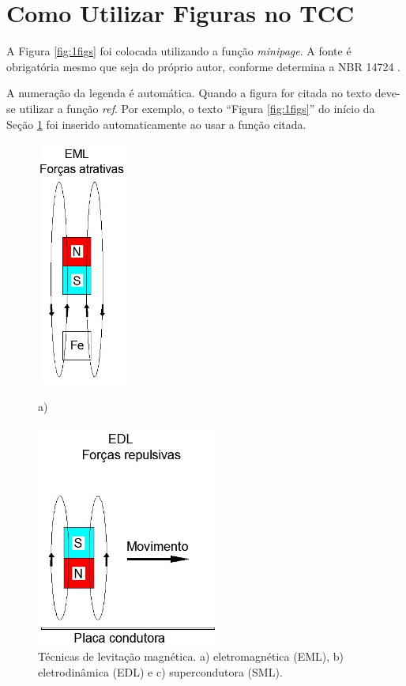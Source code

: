 \documentclass[
        oneside,      %
        english,			
        brazil			 
        ]{configcefetmglpd}
\begin{document}
\section{Como Utilizar Figuras no TCC} \label{sec:figuras_tcc}
A Figura \ref{fig:1figs} foi colocada utilizando a função \textit{minipage}. A fonte é obrigatória mesmo que seja do próprio autor, conforme determina a NBR 14724 \cite{bib:abnt14724}.

A numeração da legenda é automática. Quando a figura for citada no texto deve-se utilizar a função \textit{ref}. Por exemplo, o texto “Figura \ref{fig:1figs}” do início da Seção \ref{sec:figuras_tcc} foi inserido automaticamente ao usar a função citada.

\begin{figure}[h]
	\larguratexto{14cm}
	\centering
	\caption{Técnicas de levitação magnética. a) eletromagnética (EML), b) eletrodinâmica (EDL) e c) supercondutora (SML).}%
	\begin{minipage}[t]{3cm}%
		\includegraphics[width=3cm]{cap3_1.jpg}
		\par \centering a)
		\label{fig:EML}
	\end{minipage}%
	\hspace{1cm}
	\begin{minipage}[t]{6cm}%
		\includegraphics[width=6cm]{cap3_2.jpg}

\end{minipage}
\end{figure}
\end{document}
